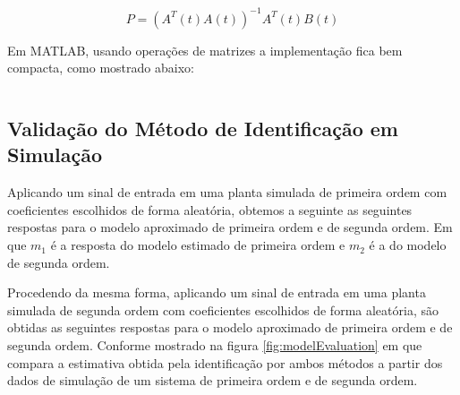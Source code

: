\documentclass[a4paper,11pt]{article}
\begin{document}
\begin{equation}
    P = \left(A^T(t) A(t)\right)^{-1} A^T(t) B(t)
\end{equation}

Em MATLAB, usando operações de matrizes a implementação fica bem compacta, como mostrado abaixo:

\inputminted[frame=single,framesep=10pt]{matlab}{../src/matlab/secondordertf.m}

\subsection{Validação do Método de Identificação em Simulação}

Aplicando um sinal de entrada em uma planta simulada de primeira ordem com coeficientes escolhidos de forma aleatória, obtemos a seguinte as seguintes respostas para o modelo aproximado de primeira ordem e de segunda ordem. Em que $m_1$ é a resposta do modelo estimado de primeira ordem e $m_2$ é a do modelo de segunda ordem.

Procedendo da mesma forma, aplicando um sinal de entrada em uma planta simulada de segunda ordem com coeficientes escolhidos de forma aleatória, são obtidas as seguintes respostas para o modelo aproximado de primeira ordem e de segunda ordem. Conforme mostrado na figura \ref{fig:modelEvaluation} em que compara a estimativa obtida pela identificação por ambos métodos a partir dos dados de simulação de um sistema de primeira ordem e de segunda ordem.
\end{document}
